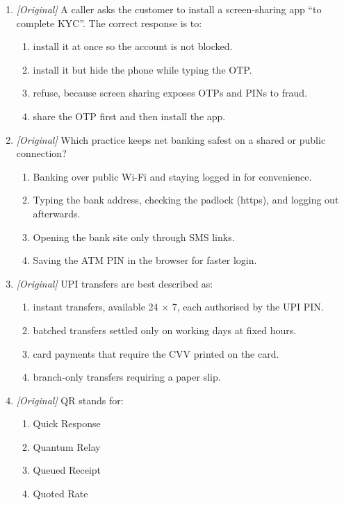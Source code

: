 \begin{enumerate}[label=\textbf{Q\arabic*.}, leftmargin=*]
\begin{enumerate}[label=\Alph*.]
  \end{enumerate}
\item \textit{[Original]} A caller asks the customer to install a
  screen-sharing app ``to complete KYC''. The correct response is to:
  \begin{enumerate}[label=\Alph*.]
    \item install it at once so the account is not blocked.
    \item install it but hide the phone while typing the OTP.
    \item refuse, because screen sharing exposes OTPs and PINs to fraud.
    \item share the OTP first and then install the app.
  \end{enumerate}
\item \textit{[Original]} Which practice keeps net banking safest on a
  shared or public connection?
  \begin{enumerate}[label=\Alph*.]
    \item Banking over public Wi-Fi and staying logged in for convenience.
    \item Typing the bank address, checking the padlock (https), and logging
      out afterwards.
    \item Opening the bank site only through SMS links.
    \item Saving the ATM PIN in the browser for faster login.
  \end{enumerate}
\item \textit{[Original]} UPI transfers are best described as:
  \begin{enumerate}[label=\Alph*.]
    \item instant transfers, available 24 $\times$ 7, each authorised by the
      UPI PIN.
    \item batched transfers settled only on working days at fixed hours.
    \item card payments that require the CVV printed on the card.
    \item branch-only transfers requiring a paper slip.
  \end{enumerate}
\item \textit{[Original]} QR stands for:
  \begin{enumerate}[label=\Alph*.]
    \item Quick Response
    \item Quantum Relay
    \item Queued Receipt
    \item Quoted Rate
  \end{enumerate}


\end{enumerate}
